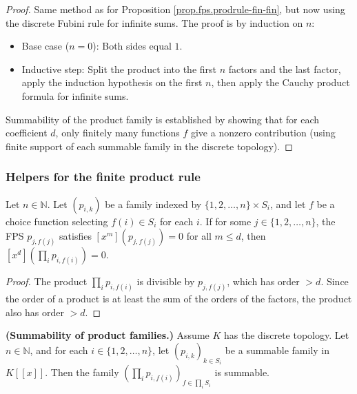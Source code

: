 \begin{proof}
Same method as for Proposition \ref{prop.fps.prodrule-fin-fin}, but now using
the discrete Fubini rule for infinite sums.
The proof is by induction on $n$:
\begin{itemize}
\item Base case ($n=0$): Both sides equal $1$.
\item Inductive step: Split the product into the first $n$ factors and the last factor,
apply the induction hypothesis on the first $n$, then apply the Cauchy
product formula for infinite sums.
\end{itemize}
Summability of the product family is established by showing that for each
coefficient $d$, only finitely many functions $f$ give a nonzero contribution
(using finite support of each summable family in the discrete topology).
\end{proof}

\subsubsection{Helpers for the finite product rule}

\begin{lemma}
\label{lem.fps.coeff-finProd-zero-of-high-order}
\leanhelper
\leanok
Let $n\in\mathbb{N}$. Let $\left(p_{i,k}\right)$ be a family indexed by
$\{1,2,\ldots,n\}\times S_i$, and let $f$ be a choice function selecting
$f(i) \in S_i$ for each $i$.
If for some $j\in\{1,2,\ldots,n\}$, the FPS $p_{j,f(j)}$ satisfies
$[x^m](p_{j,f(j)}) = 0$ for all $m\le d$, then
$[x^d]\left(\prod_{i} p_{i,f(i)}\right) = 0$.
\end{lemma}

\begin{proof}
The product $\prod_i p_{i,f(i)}$ is divisible by $p_{j,f(j)}$, which has
order $> d$. Since the order of a product is at least the sum of the orders
of the factors, the product also has order $> d$.
\end{proof}

\begin{lemma}
\label{lem.fps.summable-finProd-discrete}
\leanhelper
\leanok
\textbf{(Summability of product families.)}
Assume $K$ has the discrete topology. Let $n\in\mathbb{N}$,
and for each $i\in\{1,2,\ldots,n\}$, let $\left(p_{i,k}\right)_{k\in S_i}$
be a summable family in $K[[x]]$.
Then the family $\left(\prod_i p_{i,f(i)}\right)_{f\in\prod_i S_i}$
is summable.
\end{lemma}


